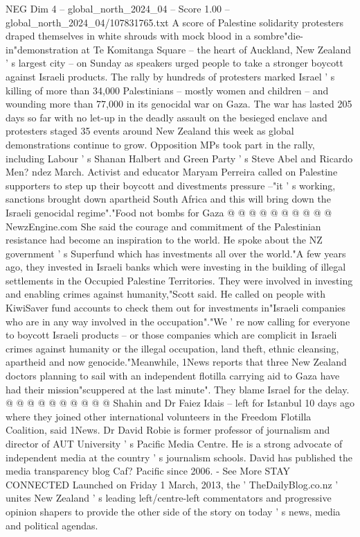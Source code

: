 \begin{textsample}{NEG Dim 4 – global\_north\_2024\_04 – Score 1.00 – global\_north\_2024\_04/107831765.txt}  \label{ex:f4_neg_091}
A score of Palestine solidarity protesters draped themselves in white shrouds with mock blood in a sombre"die-in"demonstration at Te Komitanga Square -- the heart of Auckland, New Zealand ' s largest city -- on Sunday as speakers urged people to take a stronger boycott against Israeli products.
The rally by hundreds of protesters marked Israel ' s killing of more than 34,000 Palestinians -- mostly women and children -- and wounding more than 77,000 in its genocidal war on Gaza.
The war has lasted 205 days so far with no let-up in the deadly assault on the besieged enclave and protesters staged 35 events around New Zealand this week as global demonstrations continue to grow.
Opposition MPs took part in the rally, including Labour ' s Shanan Halbert and Green Party ' s Steve Abel and Ricardo Men? ndez March.
Activist and educator Maryam Perreira called on Palestine supporters to step up their boycott and divestments pressure --"it ' s working, sanctions brought down apartheid South Africa and this will bring down the Israeli genocidal regime"."Food not bombs for Gaza @ @ @ @ @ @ @ @ @ @ NewzEngine.com She said the courage and commitment of the Palestinian resistance had become an inspiration to the world.
He spoke about the NZ government ' s Superfund which has investments all over the world."A few years ago, they invested in Israeli banks which were investing in the building of illegal settlements in the Occupied Palestine Territories.
They were involved in investing and enabling crimes against humanity,"Scott said.
He called on people with KiwiSaver fund accounts to check them out for investments in"Israeli companies who are in any way involved in the occupation"."We ' re now calling for everyone to boycott Israeli products -- or those companies which are complicit in Israeli crimes against humanity or the illegal occupation, land theft, ethnic cleansing, apartheid and now genocide."Meanwhile, 1News reports that three New Zealand doctors planning to sail with an independent flotilla carrying aid to Gaza have had their mission"scuppered at the last minute".
They blame Israel for the delay. @ @ @ @ @ @ @ @ @ @ Shahin and Dr Faiez Idais -- left for Istanbul 10 days ago where they joined other international volunteers in the Freedom Flotilla Coalition, said 1News.
Dr David Robie is former professor of journalism and director of AUT University ' s Pacific Media Centre.
He is a strong advocate of independent media at the country ' s journalism schools.
David has published the media transparency blog Caf?
Pacific since 2006. - See More STAY CONNECTED Launched on Friday 1 March, 2013, the ' TheDailyBlog.co.nz ' unites New Zealand ' s leading left/centre-left commentators and progressive opinion shapers to provide the other side of the story on today ' s news, media and political agendas.

\end{textsample}
